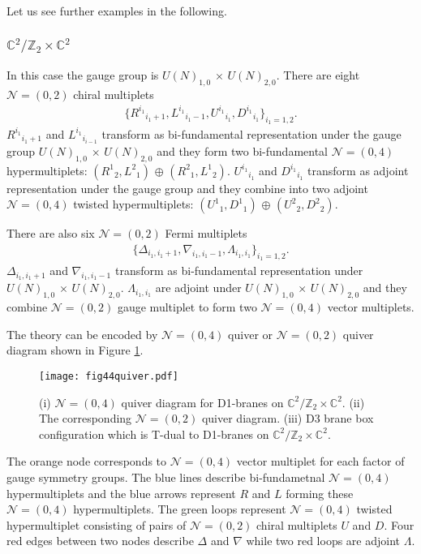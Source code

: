 \documentclass{article}
\numberwithin{equation}{section}
\begin{document}
Let us see further examples in the following. 




\subsubsection{$\mathbb{C}^{2}/\mathbb{Z}_{2}\times \mathbb{C}^{2}$}
\label{subsec_d1zkzk}
In this case the gauge group is $U(N)_{1,0}$ $\times$ $U(N)_{2,0}$. 
There are eight $\mathcal{N}=(0,2)$ chiral multiplets 
\begin{align}
\label{z2_cm}
\{ {R^{i_{1}}}_{i_{1}+1}, {L^{i_{1}}}_{i_{1}-1}, {U^{i_{1}}}_{i_{1}}, {D^{i_{1}}}_{i_{1}} \}_{i_{1}=1,2}. 
\end{align}
${R^{i_{1}}}_{i_{1}+1}$ and 
${L^{i_{1}}}_{i_{i-1}}$ transform as bi-fundamental representation 
under the gauge group $U(N)_{1,0}$ $\times$ $U(N)_{2,0}$ 
and they form two bi-fundamental $\mathcal{N}=(0,4)$ hypermultiplets: 
$({R^{1}}_{2}, {L^{2}}_{1})$ $\oplus$ $({R^{2}}_{1}, {L^{1}}_{2})$. 
${U^{i_{1}}}_{ i_{1}}$ and ${D^{i_{1}}}_{i_{1}}$ transform as adjoint representation under the gauge group 
and they combine into two adjoint $\mathcal{N}=(0,4)$ twisted hypermultiplets: 
$({U^{1}}_{1}, {D^{1}}_{1})$ $\oplus$ $({U^{2}}_{2}, {D^{2}}_{2})$. 

There are also six $\mathcal{N}=(0,2)$ Fermi multiplets 
\begin{align}
\label{z2_fm}
\{ \Delta_{i_{1}, i_{1}+1}, \nabla_{i_{1}, i_{1}-1}, \Lambda_{i_{1}, i_{1}}\}_{i_{1}=1,2}. 
\end{align}
$\Delta_{i_{1}, i_{1}+1}$ and $\nabla_{i_{1},i_{1}-1}$ transform as bi-fundamental representation 
under $U(N)_{1,0}$ $\times$ $U(N)_{2,0}$. 
$\Lambda_{i_{1},i_{1}}$ are adjoint under $U(N)_{1,0}$ $\times$ $U(N)_{2,0}$ 
and they combine $\mathcal{N}=(0,2)$ gauge multiplet to form two $\mathcal{N}=(0,4)$ vector multiplets. 


The theory can be encoded by $\mathcal{N}=(0,4)$ quiver 
or $\mathcal{N}=(0,2)$ quiver diagram shown in Figure \ref{fig44quiver}. 
\begin{figure}
\begin{center}
\texttt{[image: fig44quiver.pdf]}
\caption{
(i) $\mathcal{N}=(0,4)$ quiver diagram for D1-branes on $\mathbb{C}^{2}/\mathbb{Z}_{2}\times \mathbb{C}^{2}$. 
(ii) The corresponding $\mathcal{N}=(0,2)$ quiver diagram. 
(iii) D3 brane box configuration which is T-dual to D1-branes on $\mathbb{C}^{2}/\mathbb{Z}_{2}\times \mathbb{C}^{2}$. }
\label{fig44quiver}
\end{center}
\end{figure}
The orange node corresponds to $\mathcal{N}=(0,4)$ vector multiplet for each factor of gauge symmetry groups. 
The blue lines describe bi-fundametnal $\mathcal{N}=(0,4)$ hypermultiplets and 
the blue arrows represent $R$ and $L$ forming these $\mathcal{N}=(0,4)$ hypermultiplets. 
The green loops represent $\mathcal{N}=(0,4)$ twisted hypermultiplet consisting of 
pairs of $\mathcal{N}=(0,2)$ chiral multiplets $U$ and $D$. 
Four red edges between two nodes describe $\Delta$ and $\nabla$ 
while two red loops are adjoint $\Lambda$. 
\end{document}
